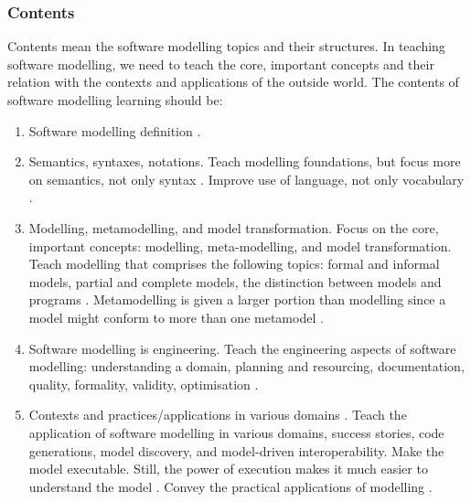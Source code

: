 \documentclass[12pt, a4paper]{report}
\begin{document}
\subsubsection{Contents}
Contents mean the software modelling topics and their structures. In teaching software modelling, we need to teach the core, important concepts and their relation with the contexts and applications of the outside world. The contents of software modelling learning should be:
\begin{enumerate}
\item Software modelling definition \cite{borstler2012teaching}.
\item Semantics, syntaxes, notations. Teach modelling foundations, but focus more on semantics, not only syntax \cite{borstler2012teaching}. Improve use of language, not only vocabulary \cite{bezivin2009teaching}.
\item Modelling, metamodelling, and model transformation. Focus on the core, important concepts: modelling, meta-modelling, and model transformation. Teach modelling that comprises the following topics: formal and informal models, partial and complete models, the distinction between models and programs \cite{bezivin2009teaching}. Metamodelling is given a larger portion than modelling since a model might conform to more than one metamodel \cite{ober2007teaching}.
\item Software modelling is engineering. Teach the engineering aspects of software modelling: understanding a domain, planning and resourcing, documentation, quality, formality, validity, optimisation \cite{paige2014bad}.
\item Contexts and practices/applications in various domains \cite{paige2014bad}. Teach the application of software modelling in various domains, success stories, code generations, model discovery, and model-driven interoperability. Make the model executable. Still, the power of execution makes it much easier to understand the model \cite{bezivin2009teaching}. Convey the practical applications of modelling \cite{borstler2012teaching}.
\end{enumerate}
\end{document}
